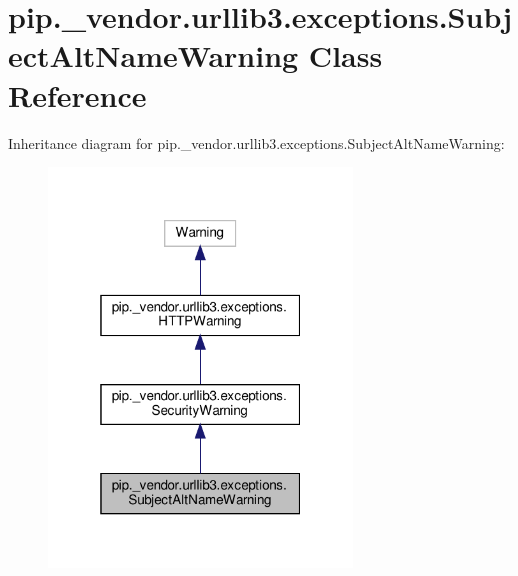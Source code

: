 \hypertarget{classpip_1_1__vendor_1_1urllib3_1_1exceptions_1_1SubjectAltNameWarning}{}\section{pip.\+\_\+vendor.\+urllib3.\+exceptions.\+Subject\+Alt\+Name\+Warning Class Reference}
\label{classpip_1_1__vendor_1_1urllib3_1_1exceptions_1_1SubjectAltNameWarning}


Inheritance diagram for pip.\+\_\+vendor.\+urllib3.\+exceptions.\+Subject\+Alt\+Name\+Warning\+:
\nopagebreak
\begin{figure}[H]
\begin{center}
\leavevmode
\includegraphics[width=229pt]{classpip_1_1__vendor_1_1urllib3_1_1exceptions_1_1SubjectAltNameWarning__inherit__graph}
\end{center}
\end{figure}


